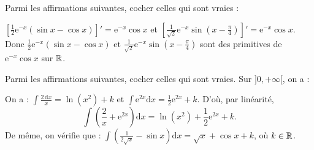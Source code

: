 \begin{question}
Parmi les affirmations suivantes, cocher celles qui sont vraies :
\begin{answers}  
\end{answers}
\begin{explanations}
$\displaystyle \left[\frac{1}{2}\mathrm{e}^{-x}\left(\sin x-\cos x\right)\right]'=\mathrm{e}^{-x}\cos x$ et $\displaystyle \left[\frac{1}{\sqrt{2}}\mathrm{e}^{-x}\sin \left(x-\frac{\pi}{4}\right)\right]'=\mathrm{e}^{-x}\cos x$. Donc $\displaystyle \frac{1}{2}\mathrm{e}^{-x}\left(\sin x-\cos x\right)$ et $\displaystyle \frac{1}{\sqrt{2}}\mathrm{e}^{-x}\sin \left(x-\frac{\pi}{4}\right)$ sont des primitives de $\displaystyle \mathrm{e}^{-x}\cos x$ sur $\mathbb{R}$.
\end{explanations}
\end{question}

\begin{question}
Parmi les affirmations suivantes, cocher celles qui sont vraies. Sur $]0,+\infty[$, on a :
\begin{answers}  
\end{answers}
\vskip3mm
\begin{explanations}
On a : $\displaystyle \int \frac{2\, \mathrm{d}x}{x}=\ln (x^2)+k$ et $\displaystyle \int\mathrm{e}^{2x}\mathrm{d}x=\frac{1}{2}\mathrm{e}^{2x}+k$. D'où, par linéarité,
$$\int \left(\frac{2}{x}+\mathrm{e}^{2x}\right)\mathrm{d}x=\ln (x^2)+\frac{1}{2}\mathrm{e}^{2x}+k.$$
De même, on vérifie que : $\displaystyle \int \left(\frac{1}{2\sqrt{x}}-\sin x\right)\mathrm{d}x=\sqrt{x}+\cos x+k$, où $k\in \mathbb{R}$.
\end{explanations}
\end{question}


